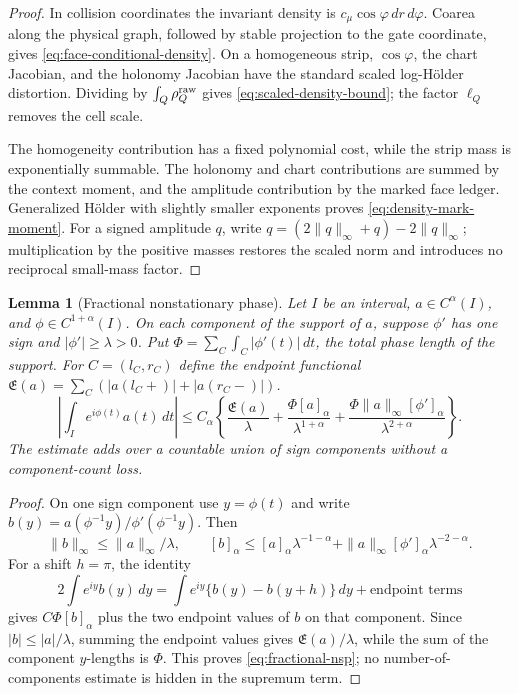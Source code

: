 \documentclass[11pt]{article}
\newtheorem{lemma}[theorem]{Lemma}
\begin{document}
\begin{proof}
In collision coordinates the invariant density is
\(c_\mu\cos\varphi\,dr\,d\varphi\).  Coarea along the physical graph, followed
by stable projection to the gate coordinate, gives
\eqref{eq:face-conditional-density}.  On a homogeneous strip,
\(\cos\varphi\), the chart Jacobian, and the holonomy Jacobian have the
standard scaled log-Hölder distortion.  Dividing by
\(\int_Q\rho_Q^{\rm raw}\) gives \eqref{eq:scaled-density-bound}; the factor
\(\ell_Q\) removes the cell scale.

The homogeneity contribution has a fixed polynomial cost, while the strip
mass is exponentially summable.  The holonomy and chart contributions are
summed by the context moment, and the amplitude contribution by the marked
face ledger.  Generalized Hölder with slightly smaller exponents proves
\eqref{eq:density-mark-moment}.  For a signed amplitude \(q\), write
\(q=(2\|q\|_\infty+q)-2\|q\|_\infty\); multiplication by the positive masses
restores the scaled norm and introduces no reciprocal small-mass factor.
\end{proof}

\begin{lemma}[Fractional nonstationary phase]
\label{lem:fractional-nonstationary-phase}
Let \(I\) be an interval, \(a\in C^\alpha(I)\), and
\(\phi\in C^{1+\alpha}(I)\).  On each component of the support of \(a\),
suppose \(\phi'\) has one sign and \(|\phi'|\ge\lambda>0\).  Put
\(\Phi=\sum_C\int_C|\phi'(t)|\,dt\), the total phase length of the support.
For $C=(l_C,r_C)$ define the endpoint functional
$\mathfrak E(a)=\sum_C(|a(l_C+)|+|a(r_C-)|)$.
\begin{equation}
\label{eq:fractional-nsp}
 \left|\int_Ie^{i\phi(t)}a(t)\,dt\right|
 \le C_\alpha\left\{
 \frac{\mathfrak E(a)}{\lambda}
 +\frac{\Phi[a]_\alpha}{\lambda^{1+\alpha}}
 +\frac{\Phi\|a\|_\infty[\phi']_\alpha}
             {\lambda^{2+\alpha}}\right\}.
\end{equation}
The estimate adds over a countable union of sign components without a
component-count loss.
\end{lemma}

\begin{proof}
On one sign component use \(y=\phi(t)\) and write
\(b(y)=a(\phi^{-1}y)/\phi'(\phi^{-1}y)\).  Then
\[
 \|b\|_\infty\le\|a\|_\infty/\lambda,\qquad
 [b]_\alpha\le
 [a]_\alpha\lambda^{-1-\alpha}
 +\|a\|_\infty[\phi']_\alpha\lambda^{-2-\alpha}.
\]
For a shift \(h=\pi\), the identity
\[
 2\int e^{iy}b(y)\,dy
 =\int e^{iy}\{b(y)-b(y+h)\}\,dy+\text{endpoint terms}
\]
gives $C\Phi[b]_\alpha$ plus the two endpoint values of $b$ on that
component.  Since $|b|\le |a|/\lambda$, summing the endpoint values gives
$\mathfrak E(a)/\lambda$, while the sum of the component $y$-lengths is
$\Phi$.  This proves \eqref{eq:fractional-nsp}; no number-of-components
estimate is hidden in the supremum term.
\end{proof}
\end{document}
